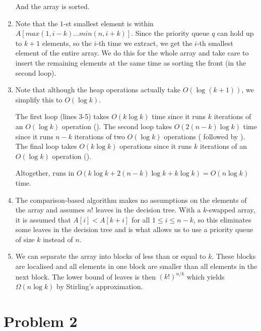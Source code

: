 \documentclass[12pt,a4paper]{article}
\begin{document}
\begin{enumerate}
	And the array is sorted.

	\item
	Note that the $1$-st smallest element is within $A[max(1,i-k) \dots min(n,i+k)]$. Since the priority queue $q$ can hold up to $k+1$ elements, so the $i$-th time we extract, we get the $i$-th smallest element of the entire array. We do this for the whole array and take care to insert the remaining elements at the same time as sorting the front (in the second loop).

	\item
	Note that although the heap operations actually take $O(\log (k + 1))$, we simplify this to $O(\log k)$.

	The first loop (lines 3-5) takes $O(k \log k)$ time since it runs $k$ iterations of an $O(\log k)$ operation ().
	The second loop takes $O(2(n-k)\log k)$ time since it runs $n - k$ iterations of two $O(\log k)$ operations ( followed by ).
	The final loop takes $O(k \log k)$ operations since it runs $k$ iterations of an $O(\log k)$ operation ().

	Altogether,  runs in $O(k \log k + 2(n-k)\log k + k \log k) = O(n \log k)$ time.

	\item
	The comparison-based algorithm makes no assumptions on the elements of the array and assumes $n!$ leaves in the decision tree. With a $k$-swapped array, it is assumed that $A[i] < A[k+i]$ for all $1 \le i \le n-k$, so this eliminates some leaves in the decision tree and is what allows us to use a priority queue of size $k$ instead of $n$.

	\item 
	We can separate the array into blocks of less than or equal to $k$. These blocks are localised and all elements in one block are smaller than all elements in the next block. The lower bound of leaves is then $(k!)^{n/k}$ which yields $\Omega(n \log k)$ by Stirling's approximation.

\end{enumerate}


\newpage
\section*{Problem 2}
\end{document}
